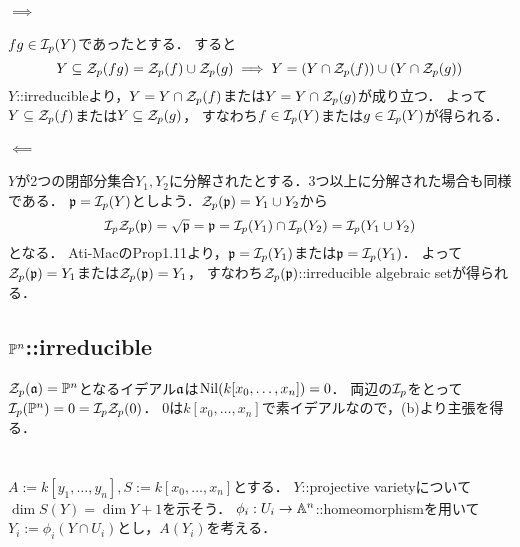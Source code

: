 \documentclass[a4paper]{jsarticle}
\begin{document}
    \paragraph{$\implies$}
    $fg \in \mathcal{I}_p(Y)$であったとする．
    すると
    \[ Y \subseteq \mathcal{Z}_p(fg)=\mathcal{Z}_p(f) \cup \mathcal{Z}_p(g) \implies Y = (Y \cap \mathcal{Z}_p(f)) \cup (Y \cap \mathcal{Z}_p(g))\]
    $Y$::irreducibleより，$Y = Y \cap \mathcal{Z}_p(f)$または$Y=Y \cap \mathcal{Z}_p(g)$が成り立つ．
    よって$Y \subseteq \mathcal{Z}_p(f)$または$Y \subseteq \mathcal{Z}_p(g)$，
    すなわち$f \in \mathcal{I}_p(Y)$または$g \in \mathcal{I}_p(Y)$が得られる．

    \paragraph{$\impliedby$}
    $Y$が2つの閉部分集合$Y_1, Y_2$に分解されたとする．3つ以上に分解された場合も同様である．
    $\mathfrak{p}=\mathcal{I}_p(Y)$としよう．$\mathcal{Z}_p(\mathfrak{p})=Y_1 \cup Y_2$から
    \[ \mathcal{I}_p\mathcal{Z}_p(\mathfrak{p})=\sqrt{\mathfrak{p}}=\mathfrak{p}=\mathcal{I}_p(Y_1) \cap \mathcal{I}_p(Y_2)=\mathcal{I}_p(Y_1 \cup Y_2) \]となる．
    Ati-MacのProp1.11より，$\mathfrak{p}=\mathcal{I}_p(Y_1)$または$\mathfrak{p}=\mathcal{I}_p(Y_1)$．
    よって$\mathcal{Z}_p(\mathfrak{p})=Y_1$または$\mathcal{Z}_p(\mathfrak{p})=Y_1$，
    すなわち$\mathcal{Z}_p(\mathfrak{p})$::irreducible algebraic setが得られる．

    \subsection{$\mathbb{P}^n$::irreducible}
    $\mathcal{Z}_p(\mathfrak{a})=\mathbb{P}^n$となるイデアル$\mathfrak{a}$は$\operatorname{Nil}(k[x_0,\dots,x_n])=0$．
    両辺の$\mathcal{I}_p$をとって$\mathcal{I}_p(\mathbb{P}^n)=0=\mathcal{I}_p\mathcal{Z}_p(0)$．
    0は$k[x_0,\dots,x_n]$で素イデアルなので，(b)より主張を得る．

\section{ } %

\section{ } %
    $A:=k[y_1,\dots,y_n], S:=k[x_0,\dots,x_n]$とする．
    $Y$::projective varietyについて$\dim S(Y)=\dim Y +1$を示そう．
    $\phi_i:U_i \to \mathbb{A}^n$::homeomorphismを用いて
    $Y_i:=\phi_i(Y \cap U_i)$とし，$A(Y_i)$を考える．

\end{document}
